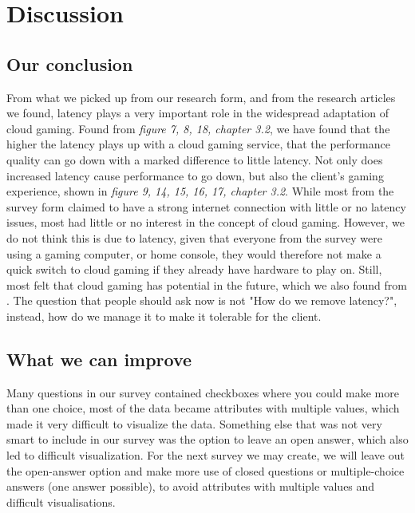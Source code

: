 \section{Discussion}

\subsection{Our conclusion}
From what we picked up from our research form, and from the research articles we found, latency plays a very important role in the widespread adaptation of cloud gaming. Found from \textit{figure 7, 8, 18, chapter 3.2}, we have found that the higher the latency plays up with a cloud gaming service, that the performance quality can go down with a marked difference to little latency. Not only does increased latency cause performance to go down, but also the client's gaming experience, shown in \textit{figure 9, 14, 15, 16, 17, chapter 3.2}. While most from the survey form claimed to have a strong internet connection with little or no latency issues, most had little or no interest in the concept of cloud gaming. However, we do not think this is due to latency, given that everyone from the survey were using a gaming computer, or home console, they would therefore not make a quick switch to cloud gaming if they already have hardware to play on. Still, most felt that cloud gaming has potential in the future, which we also found from \parencite[Chapter VI]{7536162}. The question that people should ask now is not "How do we remove latency?", instead, how do we manage it to make it tolerable for the client.\\

\subsection{What we can improve}
Many questions in our survey contained checkboxes where you could make more than one choice, most of the data became attributes with multiple values, which made it very difficult to visualize the data. Something else that was not very smart to include in our survey was the option to leave an open answer, which also led to difficult visualization. For the next survey we may create, we will leave out the open-answer option and make more use of closed questions or multiple-choice answers (one answer possible), to avoid attributes with multiple values and difficult visualisations.